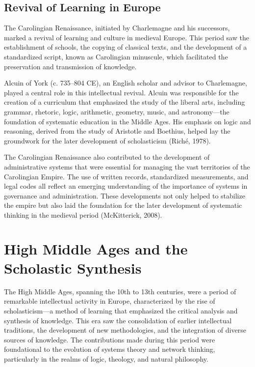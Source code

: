 \documentclass[twocolumn]{article}
\begin{document}
\subsection{Revival of Learning in Europe}


\textcolor{primary}{The Carolingian Renaissance, initiated by Charlemagne and his successors, marked a revival of learning and culture in medieval Europe. This period saw the establishment of schools, the copying of classical texts, and the development of a standardized script, known as Carolingian minuscule, which facilitated the preservation and transmission of knowledge.}

\textcolor{secondary}{Alcuin of York (c. 735–804 CE), an English scholar and advisor to Charlemagne, played a central role in this intellectual revival. Alcuin was responsible for the creation of a curriculum that emphasized the study of the liberal arts, including grammar, rhetoric, logic, arithmetic, geometry, music, and astronomy—the foundation of systematic education in the Middle Ages. His emphasis on logic and reasoning, derived from the study of Aristotle and Boethius, helped lay the groundwork for the later development of scholasticism (Riché, 1978).}

\textcolor{primary}{The Carolingian Renaissance also contributed to the development of administrative systems that were essential for managing the vast territories of the Carolingian Empire. The use of written records, standardized measurements, and legal codes all reflect an emerging understanding of the importance of systems in governance and administration. These developments not only helped to stabilize the empire but also laid the foundation for the later development of systematic thinking in the medieval period (McKitterick, 2008).}


\section{High Middle Ages and the Scholastic Synthesis} 

\textcolor{primary}{The High Middle Ages, spanning the 10th to 13th centuries, were a period of remarkable intellectual activity in Europe, characterized by the rise of scholasticism—a method of learning that emphasized the critical analysis and synthesis of knowledge. This era saw the consolidation of earlier intellectual traditions, the development of new methodologies, and the integration of diverse sources of knowledge. The contributions made during this period were foundational to the evolution of systems theory and network thinking, particularly in the realms of logic, theology, and natural philosophy.}
\end{document}
